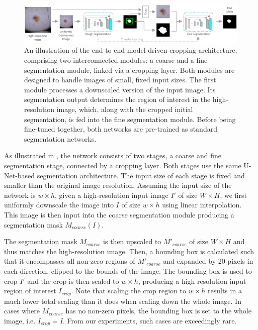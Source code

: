 \begin{figure}[b!]
\includegraphics[width=\textwidth]{images/5/e2e/diagram.pdf}
\caption{An illustration of the end-to-end model-driven cropping architecture, comprising two interconnected modules: a coarse and a fine segmentation module, linked via a cropping layer. Both modules are designed to handle images of small, fixed input sizes. The first module processes a downscaled version of the input image. Its segmentation output determines the region of interest in the high-resolution image, which, along with the cropped initial segmentation, is fed into the fine segmentation module. Before being fine-tuned together, both networks are pre-trained as standard segmentation networks.\label{fig:e2e-diagram}}\end{figure}

As illustrated in , the network consists of two stages, a coarse and fine segmentation stage, connected by a cropping layer. Both stages use the same U-Net-based segmentation architecture. The input size of each stage is fixed and smaller than the original image resolution. Assuming the input size of the network is $w \times h$, given a high-resolution input image $I'$ of size $W \times H$, we first uniformly downscale the image into $I$ of size $w \times h$ using linear interpolation. This image is then input into the coarse segmentation module producing a segmentation mask $M_{coarse}(I)$.

The segmentation mask $M_{coarse}$ is then upscaled to $M'_{coarse}$ of size $W \times H$ and thus matches the high-resolution image. Then, a bounding box is calculated such that it encompasses all non-zero regions of $M'_{coarse}$ and expanded by 20 pixels in each direction, clipped to the bounds of the image. The bounding box is used to crop $I'$ and the crop is then scaled to $w \times h$, producing a high-resolution input region of interest $I_{crop}$. Note that scaling the crop region to $w \times h$ results in a much lower total scaling than it does when scaling down the whole image. In cases where $M_{coarse}$ has no non-zero pixels, the bounding box is set to the whole image, i.e. $I_{crop} = I$. From our experiments, such cases are exceedingly rare.

